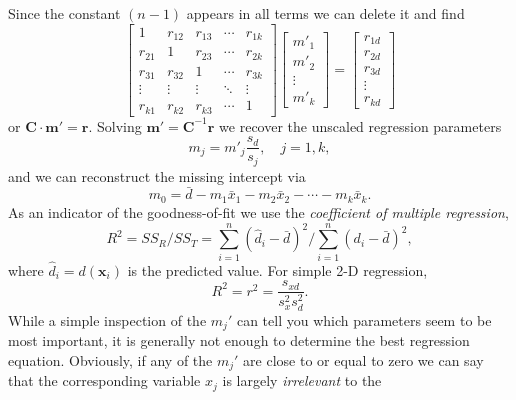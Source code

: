 Since the constant $(n-1)$ appears in all terms we can delete it and find
\begin{equation}
\left [ \begin{array}{ccccc}
1 & r_{12} & r_{13} & \cdots & r_{1k} \\
r_{21} & 1 & r_{23} &  \cdots & r_{2k} \\
r_{31} & r_{32} & 1 &  \cdots & r_{3k} \\
\vdots & \vdots & \vdots & \ddots & \vdots \\
r_{k1} & r_{k2} & r_{k3} & \cdots & 1 \end{array} \right ]
\left [
\begin{array}{c}
m'_1 \\ m'_2 \\ \vdots \\ m'_k \end{array} \right ] =
\left [ \begin{array}{c}
r_{1d} \\ r_{2d} \\ r_{3d} \\ \vdots \\ r_{kd}
\end{array} \right ]
\end{equation}	 	
or $\mathbf{C} \cdot \mathbf{m'} = \mathbf{r}$.  Solving $\mathbf{m' = C}^{-1}\mathbf{r}$ we recover the unscaled regression parameters
\begin{equation}
m_j = m'_j \frac{s_d}{s_j},\quad j = 1,k,
\end{equation}	 
and we can reconstruct the missing intercept via
\begin{equation}
m_0 = \bar{d} - m_1 \bar{x}_1 - m_2 \bar{x}_2 - \cdots - m_k \bar{x}_k.
\end{equation}	 
As an indicator of the goodness-of-fit we use the \emph{coefficient of multiple regression},
\begin{equation}
R^2 = SS_R/SS_T = \sum^n_{i=1} (\hat{d}_i - \bar{d})^2 / \sum^n_{i=1} (d_i - \bar{d})^2,
\end{equation}	 
where $\hat{d}_i = d(\mathbf{x}_i)$ is the predicted value.  For simple 2-D regression,
\begin{equation}
R^2 = r^2 = \frac{s_{xd}}{s^2_x s^2_d}.
\end{equation}	 
	While a simple inspection of the $m_j'$ can tell you which parameters seem to be most important, 
it is generally not enough to determine the best regression equation.  Obviously, if any of the $m_j'$ 
are close to or equal to zero we can say that the corresponding variable $x_j$ is largely \emph{irrelevant} to the 
